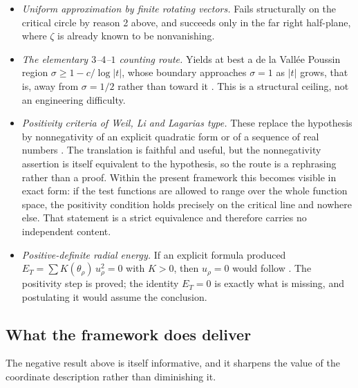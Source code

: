 \documentclass[submission,noinfoline]{jsfds}
\newcommand{\Lean}[1]{}
\newcommand{\abs}[1]{\lvert #1\rvert}
\begin{document}
\begin{itemize}
\item \emph{Uniform approximation by finite rotating vectors.} Fails
structurally on the critical circle by reason 2 above, and succeeds only in
the far right half-plane, where $\zeta$ is already known to be nonvanishing.
\Lean{hiddenZeta_ne_zero_of_u_ge_three_halves_via_rouche}
\item \emph{The elementary $3$--$4$--$1$ counting route.} Yields at best a
de la Vall\'ee Poussin region $\sigma\ge1-c/\log\abs t$, whose boundary
approaches $\sigma=1$ as $\abs t$ grows, that is, away from $\sigma=1/2$
rather than toward it \citep{Titchmarsh1986}. This is a structural ceiling,
not an engineering difficulty.
\item \emph{Positivity criteria of Weil, Li and Lagarias type.} These replace
the hypothesis by nonnegativity of an explicit quadratic form or of a
sequence of real numbers \citep{Weil1952,Lagarias2002}. The translation is
faithful and useful, but the nonnegativity assertion is itself equivalent to
the hypothesis, so the route is a rephrasing rather than a proof. Within the
present framework this becomes visible in exact form: if the test functions
are allowed to range over the whole function space, the positivity condition
holds precisely on the critical line and nowhere else. That statement is a
strict equivalence and therefore carries no independent content.
\Lean{fourth_direction_positivity_iff_critical}
\item \emph{Positive-definite radial energy.} If an explicit formula produced
$E_T=\sum K(\theta_\rho)\,u_\rho^{2}=0$ with $K>0$, then $u_\rho=0$ would
follow \Lean{on_critical_line_of_weighted_energy_eq_zero}. The positivity
step is proved; the identity $E_T=0$ is exactly what is missing, and
postulating it would assume the conclusion.
\end{itemize}

\subsection{What the framework does deliver}

The negative result above is itself informative, and it sharpens the value of
the coordinate description rather than diminishing it.
\end{document}
